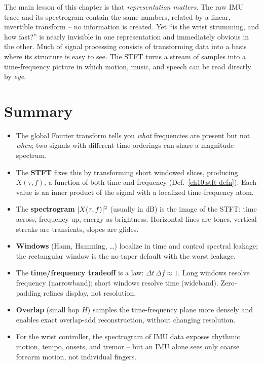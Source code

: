 \begin{aestheticbox}
The main lesson of this chapter is that \emph{representation matters}. The raw
IMU trace and its spectrogram contain the same numbers, related by a linear,
invertible transform -- no information is created. Yet ``is the wrist strumming,
and how fast?'' is nearly invisible in one representation and immediately obvious in
the other. Much of signal processing consists of transforming data into a basis where its
structure is easy to see. The STFT turns a stream of samples into a time-frequency
picture in which motion, music, and speech can be read directly by \emph{eye}.
\end{aestheticbox}

\section{Summary}
\label{ch10:summary}

\begin{itemize}
  \item The global Fourier transform tells you \emph{what} frequencies are present
        but not \emph{when}; two signals with different time-orderings can share a
        magnitude spectrum.
  \item The \textbf{STFT} fixes this by transforming short windowed slices,
        producing $X(\tau,f)$, a function of both time and frequency
        (Def.~\ref{ch10:stft-defn}). Each value is an inner product of the signal
        with a localized time-frequency atom.
  \item The \textbf{spectrogram} $\lvert X(\tau,f)\rvert^2$ (usually in dB) is the image
        of the STFT: time across, frequency up, energy as brightness. Horizontal
        lines are tones, vertical streaks are transients, slopes are glides.
  \item \textbf{Windows} (Hann, Hamming, \dots) localize in time and control
        spectral leakage; the rectangular window is the no-taper default with the
        worst leakage.
  \item The \textbf{time/frequency tradeoff} is a law: $\Delta t\,\Delta f
        \approx 1$. Long windows resolve frequency (narrowband); short windows
        resolve time (wideband). Zero-padding refines display, not resolution.
  \item \textbf{Overlap} (small hop $H$) samples the time-frequency plane more
        densely and enables exact overlap-add reconstruction, without changing
        resolution.
  \item For the wrist controller, the spectrogram of IMU data exposes rhythmic
        motion, tempo, onsets, and tremor -- but an IMU alone sees only coarse
        forearm motion, not individual fingers.
\end{itemize}

